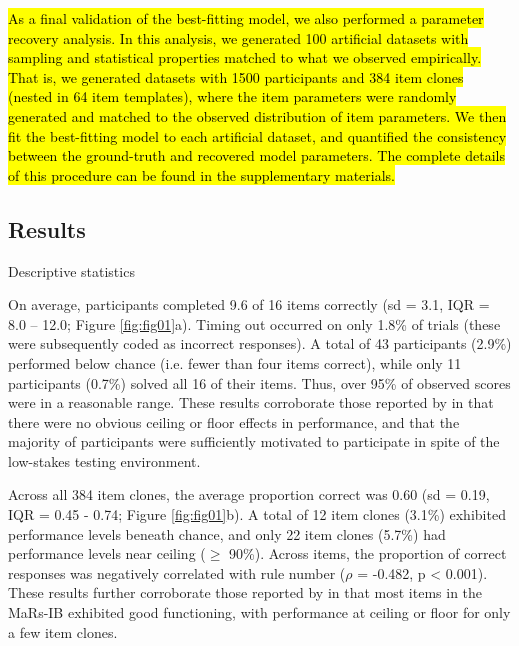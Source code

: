 \documentclass[a4paper,man,natbib]{apa6}
\makeatletter
\renewcommand{\subsubsection}{\@startsection{subsubsection}{3}
  {\z@}%
  {\b@level@two@skip}{\e@level@two@skip}%
  {\normalfont\normalsize\bfseries}}
\makeatother
\begin{document}
\hl{As a final validation of the best-fitting model, we also performed a parameter recovery analysis. In this analysis, we generated 100 artificial datasets with sampling and statistical properties matched to what we observed empirically. That is, we generated datasets with 1500 participants and 384 item clones (nested in 64 item templates), where the item parameters were randomly generated and matched to the observed distribution of item parameters. We then fit the best-fitting model to each artificial dataset, and quantified the consistency between the ground-truth and recovered model parameters. The complete details of this procedure can be found in the supplementary materials.}

\subsection{Results}

\subsubsection{Descriptive statistics}

On average, participants completed 9.6 of 16 items correctly (sd = 3.1, IQR = 8.0 -- 12.0; Figure \ref{fig:fig01}a). Timing out occurred on only 1.8\% of trials (these were subsequently coded as incorrect responses). A total of 43 participants (2.9\%) performed below chance (i.e. fewer than four items correct), while only 11 participants (0.7\%) solved all 16 of their items. Thus, over 95\% of observed scores were in a reasonable range. These results corroborate those reported by \cite{chierchia2019matrix} in that there were no obvious ceiling or floor effects in performance, and that the majority of participants were sufficiently motivated to participate in spite of the low-stakes testing environment.  

Across all 384 item clones, the average proportion correct was 0.60 (sd = 0.19, IQR = 0.45 - 0.74; Figure \ref{fig:fig01}b). A total of 12 item clones (3.1\%) exhibited performance levels beneath chance, and only 22 item clones (5.7\%) had performance levels near ceiling ($\geq$ 90\%). Across items, the proportion of correct responses was negatively correlated with rule number ($\rho$ = -0.482, p < 0.001). These results further corroborate those reported by \cite{chierchia2019matrix} in that most items in the MaRs-IB exhibited good functioning, with performance at ceiling or floor for only a few item clones. 
\end{document}
